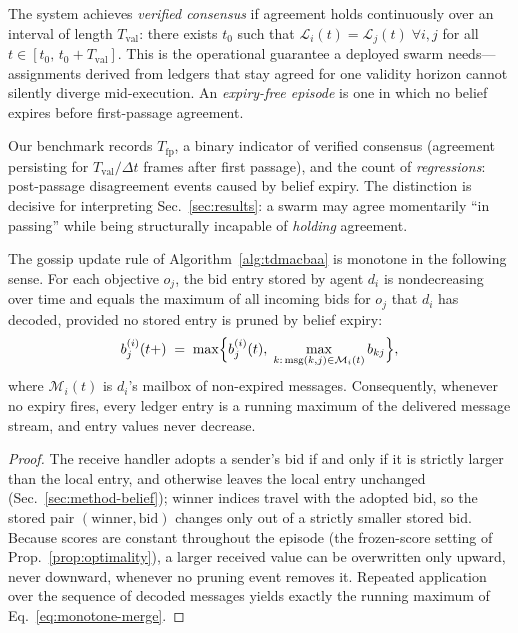 \begin{definition}\label{def:verified}
The system achieves \emph{verified consensus} if agreement holds continuously over an interval of length $T_{\mathrm{val}}$: there exists $t_0$ such that $\mathcal{L}_i(t) = \mathcal{L}_j(t)\;\forall i,j$ for all $t \in [t_0,\, t_0 + T_{\mathrm{val}}]$.
This is the operational guarantee a deployed swarm needs---assignments derived from ledgers that stay agreed for one validity horizon cannot silently diverge mid-execution.
An \emph{expiry-free episode} is one in which no belief expires before first-passage agreement.
\end{definition}

Our benchmark records $T_{\mathrm{fp}}$, a binary indicator of verified consensus (agreement persisting for $T_{\mathrm{val}}/\Delta t$ frames after first passage), and the count of \emph{regressions}: post-passage disagreement events caused by belief expiry.
The distinction is decisive for interpreting Sec.~\ref{sec:results}: a swarm may agree momentarily ``in passing'' while being structurally incapable of \emph{holding} agreement.

\begin{lemma}\label{lem:monotone}
The gossip update rule of Algorithm~\ref{alg:tdmacbaa} is monotone in the following sense. For each objective $o_j$, the bid entry stored by agent $d_i$ is nondecreasing over time and equals the maximum of all incoming bids for $o_j$ that $d_i$ has decoded, provided no stored entry is pruned by belief expiry:
\begin{equation}
    b^{(i)}_j(t{+}) \;=\; \max\Bigl\{ b^{(i)}_j(t),\; \max_{k:\,\mathrm{msg}(k,j)\in \mathcal{M}_i(t)} b_{kj}\Bigr\},
    \label{eq:monotone-merge}
\end{equation}
where $\mathcal{M}_i(t)$ is $d_i$'s mailbox of non-expired messages. Consequently, whenever no expiry fires, every ledger entry is a running maximum of the delivered message stream, and entry values never decrease.
\end{lemma}

\begin{proof}
The receive handler adopts a sender's bid if and only if it is strictly larger than the local entry, and otherwise leaves the local entry unchanged (Sec.~\ref{sec:method-belief}); winner indices travel with the adopted bid, so the stored pair $(\mathrm{winner}, \mathrm{bid})$ changes only out of a strictly smaller stored bid. Because scores are constant throughout the episode (the frozen-score setting of Prop.~\ref{prop:optimality}), a larger received value can be overwritten only upward, never downward, whenever no pruning event removes it. Repeated application over the sequence of decoded messages yields exactly the running maximum of Eq.~\eqref{eq:monotone-merge}.
\end{proof}

